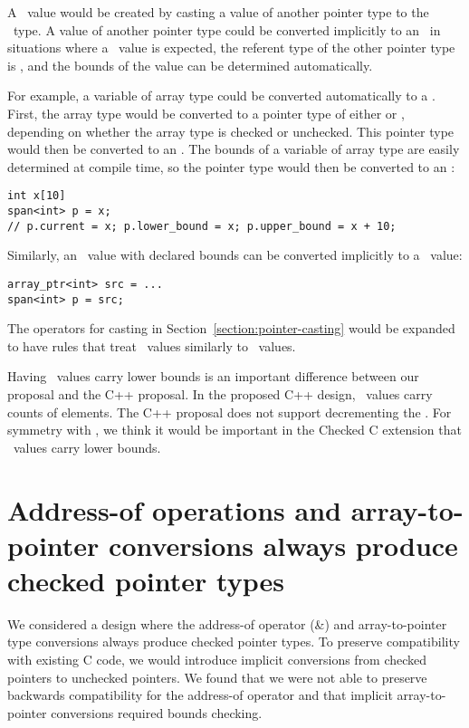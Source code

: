 A \spanptrT\ value would be created by casting a value of another pointer type to the
\spanptrT\ type. A
value of another pointer type could be converted implicitly to an
\spanptrT\ in
situations where a
\spanptrT\ value is
expected, the referent type of the other pointer type is , and
the bounds of the value can be determined automatically.

For example, a variable of array type could be converted automatically to
a \spanptr. First, the array type would be converted to a
pointer type of either  \code{*} or
\arrayptrT , depending
on whether the array type is checked or unchecked. This pointer type
would then be converted to an
\spanptrT. The
bounds of a variable of array type are easily determined at compile
time, so the pointer type would then be converted to an
\spanptrT:

\begin{lstlisting}
int x[10]
span<int> p = x;
// p.current = x; p.lower_bound = x; p.upper_bound = x + 10;

\end{lstlisting}

Similarly, an \arrayptr\ value with declared bounds can be
converted implicitly to a \spanptr\ value:

\begin{lstlisting}
array_ptr<int> src = ...
span<int> p = src;
\end{lstlisting}

The operators for casting in Section~\ref{section:pointer-casting} would be expanded
to have rules that treat \spanptr\ values similarly to \arrayptr\ values.

Having \spanptr\ values carry lower bounds is an important difference between our
proposal and the C++ proposal.   In the proposed C++ design, \spanptr\ values
carry counts of elements.  The C++ proposal does not
support decrementing the \spanptr.   For symmetry with \arrayptr, we think it
would be important in the Checked C extension that \spanptr\ values carry lower bounds.

\section{Address-of operations and array-to-pointer conversions always produce checked pointer types}

We considered a design where the address-of operator (\&) and
array-to-pointer type conversions always produce checked pointer types. To
preserve compatibility with existing C code, we would introduce implicit
conversions from checked pointers to unchecked pointers. We found that we were
not able to preserve backwards compatibility for the address-of operator
and that implicit array-to-pointer conversions required bounds checking.

